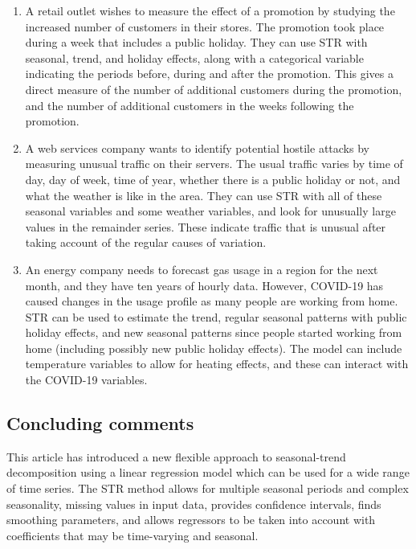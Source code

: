 \documentclass[11pt,a4paper,]{article}
\providecommand{\tightlist}{%
  \setlength{\itemsep}{0pt}\setlength{\parskip}{0pt}}
\begin{document}
\begin{enumerate}
\def\labelenumi{\arabic{enumi}.}
\tightlist
\item
  A retail outlet wishes to measure the effect of a promotion by studying the increased number of customers in their stores. The promotion took place during a week that includes a public holiday. They can use STR with seasonal, trend, and holiday effects, along with a categorical variable indicating the periods before, during and after the promotion. This gives a direct measure of the number of additional customers during the promotion, and the number of additional customers in the weeks following the promotion.
\item
  A web services company wants to identify potential hostile attacks by measuring unusual traffic on their servers. The usual traffic varies by time of day, day of week, time of year, whether there is a public holiday or not, and what the weather is like in the area. They can use STR with all of these seasonal variables and some weather variables, and look for unusually large values in the remainder series. These indicate traffic that is unusual after taking account of the regular causes of variation.
\item
  An energy company needs to forecast gas usage in a region for the next month, and they have ten years of hourly data. However, COVID-19 has caused changes in the usage profile as many people are working from home. STR can be used to estimate the trend, regular seasonal patterns with public holiday effects, and new seasonal patterns since people started working from home (including possibly new public holiday effects). The model can include temperature variables to allow for heating effects, and these can interact with the COVID-19 variables.
\end{enumerate}

\hypertarget{concluding-comments}{%
\subsection{Concluding comments}\label{concluding-comments}}

This article has introduced a new flexible approach to seasonal-trend decomposition using a linear regression model which can be used for a wide range of time series. The STR method allows for multiple seasonal periods and complex seasonality, missing values in input data, provides confidence intervals, finds smoothing parameters, and allows regressors to be taken into account with coefficients that may be time-varying and seasonal.
\end{document}
